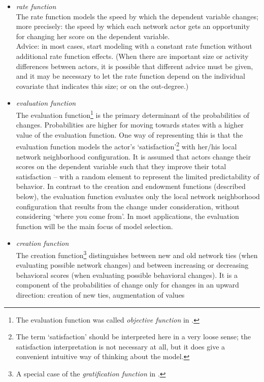 \documentclass[a4paper,fleqn,11pt]{article}
\newcommand{\+}{\, + \,}
\begin{document}
\begin{itemize}
\item \emph{rate function}\\
The rate function models the speed by which the dependent variable
changes; more precisely: the speed by which each network actor
gets an opportunity for changing her score on the dependent
variable.\\
Advice: in most cases, start modeling with a constant rate function without
additional rate function effects.
(When there are important size or activity differences between
actors, it is possible that different advice must be given,
and it may be necessary to let the rate function
depend on the individual covariate that indicates this size;
or on the out-degree.)
\item {\em evaluation function }\\
The evaluation function\footnote{The evaluation function was called
\emph{objective function} in \citet{Snijders01}.}
is the primary determinant of the probabilities of changes.
Probabilities are higher for moving towards states with a higher value
of the evaluation function.
One way of representing this is that the evaluation function
models the actor's `satisfaction'\footnote{The term
`satisfaction' should be interpreted here in a very loose sense;
the satisfaction interpretation is not necessary at all, but it does give
a convenient intuitive way of thinking about the model.}
with her/his local
network neighborhood configuration. It is assumed that actors
change their scores on the dependent variable such that they
improve their total satisfaction -- with a random element
to represent the limited predictability of behavior.
In contrast to the creation and endowment
functions (described below), the evaluation function evaluates only
the local network neighborhood configuration that results from the
change under consideration, without considering `where you come from'.
In most applications, the evaluation function will
be the main focus of model selection.\\
\item {\em creation function }\\
The creation function\footnote{A special case of the {\it gratification
function} in \citet{Snijders01}.}
distinguishes between new and old network
ties (when evaluating possible network changes) and between
increasing or decreasing behavioral scores (when evaluating
possible behavioral changes).
It is a component of the probabilities of change only for changes in
an upward direction: creation of new ties, augmentation of values

\end{itemize}
\end{document}
